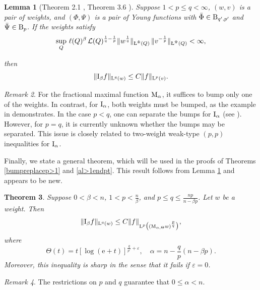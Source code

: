 \documentclass[11pt, a4paper, reqno]{amsart}
\newcommand{\Lup}{\textup{L}}
\newcommand{\Ldash}{\textup{\L}}
\newtheorem{theorem}{Theorem}[section]
\newtheorem{lemma}[theorem]{Lemma}
\theoremstyle{definition}
\theoremstyle{remark}
\newtheorem{remark}[theorem]{Remark}
\begin{document}
\begin{lemma}[Theorem 2.1 \cite{Per94}, Theorem 3.6 \cite{CM}] \label{strongbumpI}
Suppose $1<p\leq q< \infty$, \((w,v)\) is a pair of weights, and \((\Phi,\Psi)\) is a pair of Young functions with \(\bar{\Phi}\in \textup B_{q',p'}\) and \(\bar{\Psi}\in \textup B_p\). If the weights satisfy
\begin{equation}\label{twosidebump}
\sup_Q \, \ell(Q)^\beta \, \mathcal{L}(Q)^{\frac{1}{q}-\frac{1}{p}}
\|w^{\frac{1}{q}}\|_{\Ldash^\Phi(Q)} \, 
\|v^{-\frac{1}{p}}\|_{\Ldash^\Psi(Q)} < \infty,
\end{equation}

then
\[
\|\textup{I}_\beta f\|_{\Lup^q(w)} \le C \|f\|_{\Lup^p(v)}.
\]
\end{lemma}
\begin{remark}
For the fractional maximal function \(\textup{M}_\alpha\), it suffices to bump only one of the weights. In contrast, for \(\textup{I}_\alpha\), both weights must be bumped, as the example in \cite{CM} demonstrates. In the case \(p<q\), one can separate the bumps for \(\textup{I}_\alpha\) (see \cite{CM}). However, for \(p=q\), it is currently unknown whether the bumps may be separated. This issue is closely related to two-weight weak-type \((p,p)\) inequalities for \(\textup{I}_\alpha\).
\end{remark}

Finally, we state a general theorem, which will be used in the proofs of Theorems \ref{bumpreplacep>1} and \ref{al>1endpt}. This result follows from Lemma \ref{strongbumpI} and appears to be new.

\begin{theorem} \label{generalmax}
Suppose $0<\beta<n$, $1<p<\frac{n}{\beta}$, and $p\leq q\leq \frac{np}{n-\beta p}$. Let $w$ be a weight. Then
\begin{equation}\label{generalIalbd}
\|\textup{I}_\beta f\|_{\Lup^q(w)} \leq C \|f\|_{\Lup^p\big((\textup{M}_{\alpha,\Theta}w)^{\frac{p}{q}}\big)},
\end{equation}
where 
\[
\Theta(t) = t[\log(\mathrm e + t)]^{\frac{q}{p'} + \varepsilon}, 
\quad \alpha = n - \frac{q}{p}(n-\beta p).
\]
Moreover, this inequality is sharp in the sense that it fails if $\varepsilon = 0$.
\end{theorem}

\begin{remark} 
The restrictions on $p$ and $q$ guarantee that $0 \leq \alpha < n$.
\end{remark}
\end{document}
